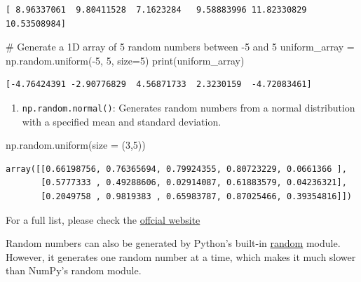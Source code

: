 \documentclass[
  letterpaper,
  DIV=11,
  numbers=noendperiod]{scrreprt}
\newenvironment{Shaded}{\begin{snugshade}}{\end{snugshade}}
\newcommand{\BuiltInTok}[1]{\textcolor[rgb]{0.00,0.23,0.31}{#1}}
\newcommand{\CommentTok}[1]{\textcolor[rgb]{0.37,0.37,0.37}{#1}}
\newcommand{\DecValTok}[1]{\textcolor[rgb]{0.68,0.00,0.00}{#1}}
\newcommand{\NormalTok}[1]{\textcolor[rgb]{0.00,0.23,0.31}{#1}}
\newcommand{\OperatorTok}[1]{\textcolor[rgb]{0.37,0.37,0.37}{#1}}
\providecommand{\tightlist}{%
  \setlength{\itemsep}{0pt}\setlength{\parskip}{0pt}}\usepackage{longtable,booktabs,array}
\begin{document}
\begin{verbatim}
[ 8.96337061  9.80411528  7.1623284   9.58883996 11.82330829 10.53508984]
\end{verbatim}

\begin{Shaded}
\begin{Highlighting}[]
\CommentTok{\# Generate a 1D array of 5 random numbers between {-}5 and 5}
\NormalTok{uniform\_array }\OperatorTok{=}\NormalTok{ np.random.uniform(}\OperatorTok{{-}}\DecValTok{5}\NormalTok{, }\DecValTok{5}\NormalTok{, size}\OperatorTok{=}\DecValTok{5}\NormalTok{)}
\BuiltInTok{print}\NormalTok{(uniform\_array)}
\end{Highlighting}
\end{Shaded}

\begin{verbatim}
[-4.76424391 -2.90776829  4.56871733  2.3230159  -4.72083461]
\end{verbatim}

\begin{enumerate}
\def\labelenumi{\arabic{enumi}.}
\setcounter{enumi}{5}
\tightlist
\item
  \texttt{np.random.normal()}: Generates random numbers from a normal
  distribution with a specified mean and standard deviation.
\end{enumerate}

\begin{Shaded}
\begin{Highlighting}[]
\NormalTok{np.random.uniform(size }\OperatorTok{=}\NormalTok{ (}\DecValTok{3}\NormalTok{,}\DecValTok{5}\NormalTok{))}
\end{Highlighting}
\end{Shaded}

\begin{verbatim}
array([[0.66198756, 0.76365694, 0.79924355, 0.80723229, 0.0661366 ],
       [0.5777333 , 0.49288606, 0.02914087, 0.61883579, 0.04236321],
       [0.2049758 , 0.9819383 , 0.65983787, 0.87025466, 0.39354816]])
\end{verbatim}

For a full list, please check the
\href{https://numpy.org/doc/stable/reference/random/generated/numpy.random.randint.html}{offcial
website}

Random numbers can also be generated by Python's built-in
\href{https://docs.python.org/3/library/random.html}{random} module.
However, it generates one random number at a time, which makes it much
slower than NumPy's random module.
\end{document}
